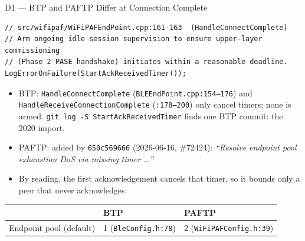 \documentclass[10pt,aspectratio=169,t]{beamer}
\newcommand{\spec}[1]{\textcolor{blue!50!black}{\small\itshape #1}}
\begin{document}
\begin{frame}[fragile]{D1 --- BTP and PAFTP Differ at Connection Complete}
\begin{lstlisting}[style=cppsmall]
// src/wifipaf/WiFiPAFEndPoint.cpp:161-163  (HandleConnectComplete)
// Arm ongoing idle session supervision to ensure upper-layer commissioning
// (Phase 2 PASE handshake) initiates within a reasonable deadline.
LogErrorOnFailure(StartAckReceivedTimer());
\end{lstlisting}
\begin{itemize}\small
  \item BTP: \texttt{HandleConnectComplete} (\texttt{BLEEndPoint.cpp:154--176}) and
        \texttt{HandleReceiveConnectionComplete} (\texttt{:178--200}) only cancel
        timers; none is armed. \texttt{git log -S StartAckReceivedTimer} finds
        one BTP commit: the 2020 import.
  \item PAFTP: added by \texttt{650c569666} (2026-06-16, \#72424): \spec{``Resolve
        endpoint pool exhaustion DoS via missing timer \ldots''}
  \item By reading, the first acknowledgement cancels that timer, so it bounds
        only a peer that never acknowledges
\end{itemize}
\begin{center}
\footnotesize
\begin{tabular}{lll}
\toprule
 & \textbf{BTP} & \textbf{PAFTP} \\
\midrule
Endpoint pool (default) & 1 (\texttt{BleConfig.h:78}) & 2 (\texttt{WiFiPAFConfig.h:39}) \\
\bottomrule
\end{tabular}
\end{center}
\end{frame}
\end{document}
